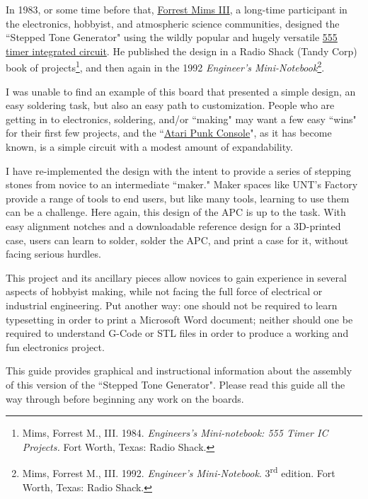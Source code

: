 \documentclass[12pt]{article}
\newcommand{\+}{\item}		%
\begin{document}
In 1983, or some time before that, {\color{webblue}\href{http://www.forrestmims.org}{Forrest Mims III}}, a long-time participant in the electronics, hobbyist, and atmospheric science communities, designed the ``Stepped Tone Generator" using the wildly popular and hugely versatile {\color{webblue}\href{https://en.wikipedia.org/wiki/555_timer_IC}{555 timer integrated circuit}}. He published the design in a Radio Shack (Tandy Corp) book of projects\footnote{Mims, Forrest M., III. 1984. \emph{Engineers's Mini-notebook: 555 Timer IC Projects.} Fort Worth, Texas: Radio Shack.}, and then again in the 1992 \emph{Engineer's Mini-Notebook}\footnote{Mims, Forrest M., III. 1992. \emph{Engineer's Mini-Notebook}. 3\textsuperscript{rd} edition. Fort Worth, Texas: Radio Shack.}.

I was unable to find an example of this board that presented a simple design, an easy soldering task, but also an easy path to customization. People who are getting in to electronics, soldering, and/or ``making" may want a few easy ``wins" for their first few projects, and the ``{\color{webblue}\href{https://en.wikipedia.org/wiki/Atari_Punk_Console}{Atari Punk Console}}", as it has become known, is a simple circuit with a modest amount of expandability. 

I have re-implemented the design with the intent to provide a series of stepping stones from novice to an intermediate ``maker." Maker spaces like UNT's Factory provide a range of tools to end users, but like many tools, learning to use them can be a challenge. Here again, this design of the APC is up to the task. With easy alignment notches and a downloadable reference design for a 3D-printed case, users can learn to solder, solder the APC, and print a case for it, without facing serious hurdles. 

This project and its ancillary pieces allow novices to gain experience in several aspects of hobbyist making, while not facing the full force of electrical or industrial engineering. Put another way: one should not be required to learn typesetting in order to print a Microsoft Word document; neither should one be required to understand G-Code or STL files in order to produce a working and fun electronics project.

This guide provides graphical and instructional information about the assembly of this version of the ``Stepped Tone Generator". Please read this guide all the way through before beginning any work on the boards. 


\end{document}
